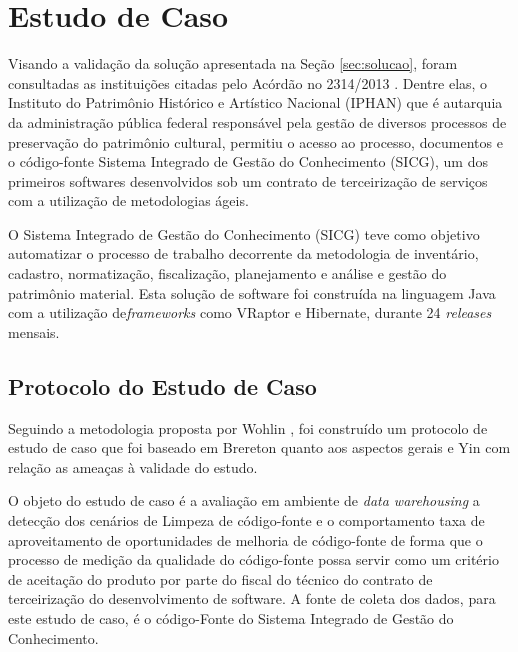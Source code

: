 \section {Estudo de Caso}

Visando a validação da solução apresentada na Seção \ref{sec:solucao}, foram consultadas as instituições citadas pelo Acórdão no 2314/2013 \cite{TCU:2013}. Dentre elas, o Instituto do Patrimônio Histórico e Artístico Nacional (IPHAN) que é autarquia da administração pública federal responsável pela gestão de diversos processos de preservação do patrimônio cultural, permitiu o acesso ao processo, documentos e o código-fonte Sistema Integrado de Gestão do Conhecimento (SICG), um dos primeiros softwares desenvolvidos sob um contrato de terceirização de serviços com a utilização de metodologias ágeis.

O Sistema Integrado de Gestão do Conhecimento (SICG) teve como objetivo automatizar o processo de trabalho decorrente da metodologia de inventário, cadastro, normatização, fiscalização, planejamento e análise e gestão do patrimônio material. Esta solução de software foi construída na linguagem Java com a utilização de\textit{frameworks} como VRaptor e Hibernate, durante 24 \textit{releases} mensais.

\subsection{Protocolo do Estudo de Caso}
Seguindo a metodologia proposta por Wohlin \cite{wohlin2012experimentation}, foi construído um protocolo de estudo de caso que foi baseado em Brereton \cite{brereton2008using} quanto aos aspectos gerais e Yin \cite{yin2011applications} com relação as ameaças à validade do estudo. 

O objeto do estudo de caso é a avaliação em ambiente de \textit{data warehousing} a detecção dos cenários de Limpeza de código-fonte e o comportamento taxa de aproveitamento de oportunidades de melhoria de código-fonte de forma que o processo de medição da qualidade do código-fonte possa servir como um critério de aceitação do produto por parte do fiscal do técnico do contrato de terceirização do desenvolvimento de software. A fonte de coleta dos dados, para este estudo de caso, é o código-Fonte do Sistema Integrado de Gestão do Conhecimento.

